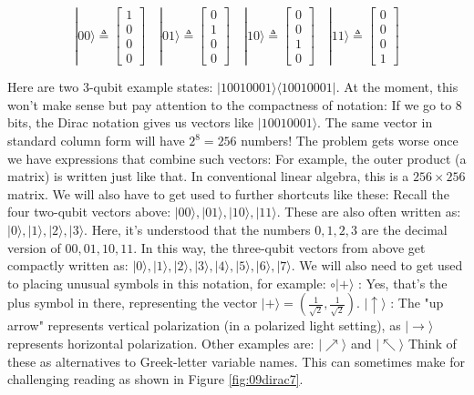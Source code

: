 \documentclass[main.tex]{subfiles}
\begin{document}
    $$
    |00\rangle \triangleq\left[\begin{array}{l}1 \\ 0 \\ 0 \\ 0\end{array}\right] \quad|01\rangle \triangleq\left[\begin{array}{l}0 \\ 1 \\ 0 \\ 0\end{array}\right] \quad|10\rangle \triangleq\left[\begin{array}{l}0 \\ 0 \\ 1 \\ 0\end{array}\right] \quad|11\rangle \triangleq\left[\begin{array}{l}0 \\ 0 \\ 0 \\ 1\end{array}\right]
    $$
    
    Here are two 3-qubit example states: $|10010001\rangle\langle 10010001|$. At the moment, this won't make sense but pay attention to the compactness of notation: If we go to 8 bits, the Dirac notation gives us vectors like $|10010001\rangle$. The same vector in standard column form will have $2^{8}=256$ numbers! The problem gets worse once we have expressions that combine such vectors: For example, the outer product (a matrix) is written just like that. In conventional linear algebra, this is a $256 \times 256$ matrix. We will also have to get used to further shortcuts like these: Recall the four two-qubit vectors above: $|00\rangle,|01\rangle,|10\rangle,|11\rangle$. These are also often written as: $|0\rangle,|1\rangle,|2\rangle,|3\rangle$. Here, it's understood that the numbers $0,1,2,3$ are the decimal version of $00,01,10,11$. In this way, the three-qubit vectors from above get compactly written as: $|0\rangle,|1\rangle,|2\rangle,|3\rangle,|4\rangle,|5\rangle,|6\rangle,|7\rangle$. We will also need to get used to placing unusual symbols in this notation, for example: $\circ|+\rangle$ : Yes, that's the plus symbol in there, representing the vector $|+\rangle=\left(\frac{1}{\sqrt{2}}, \frac{1}{\sqrt{2}}\right)$. $|\uparrow\rangle$ : The "up arrow" represents vertical polarization (in a polarized light setting), as $|\rightarrow\rangle$ represents horizontal polarization. Other examples are: $|\nearrow\rangle$ and $|\nwarrow\rangle$ Think of these as alternatives to Greek-letter variable names. This can sometimes make for challenging reading as shown in Figure \ref{fig:09dirac7}.
    
\end{document}
